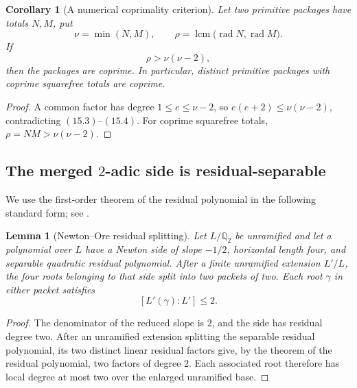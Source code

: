 \documentclass[11pt]{article}
\newtheorem{lemma}[theorem]{Lemma}
\newtheorem{corollary}[theorem]{Corollary}
\theoremstyle{definition}
\newcommand{\Q}{\mathbb Q}
\begin{document}
\begin{corollary}[A numerical coprimality criterion]
\label{cor:radicalcriterion}
Let two primitive packages have totals \(N,M\), put
\[
 \nu=\min(N,M),\qquad
 \rho=\operatorname{lcm}\bigl(\operatorname{rad}N,
                                \operatorname{rad}M\bigr).
\]
If
\begin{equation}
 \rho>\nu(\nu-2),
 \tag{15.4}
\end{equation}
then the packages are coprime.  In particular, distinct primitive packages
with coprime squarefree totals are coprime.
\end{corollary}

\begin{proof}
A common factor has degree \(1\leq e\leq\nu-2\), so
\(e(e+2)\leq\nu(\nu-2)\), contradicting \((15.3)\)--\((15.4)\).
For coprime squarefree totals, \(\rho=NM>\nu(\nu-2)\).
\end{proof}

\subsection{The merged \texorpdfstring{\(2\)}{2}-adic side is residual-separable}

We use the first-order theorem of the residual polynomial in the following
standard form; see \cite[Theorem~1.21]{GuardiaMontesNart2008}.

\begin{lemma}[Newton--Ore residual splitting]
\label{lem:oreresidual}
Let \(L/\Q_2\) be unramified and let a polynomial over \(L\) have a
Newton side of slope \(-1/2\), horizontal length four, and separable
quadratic residual polynomial.  After a finite unramified extension
\(L'/L\), the four roots belonging to that side split into two packets of
two.  Each root \(\gamma\) in either packet satisfies
\[
 [L'(\gamma):L']\leq2.
\]
\end{lemma}

\begin{proof}
The denominator of the reduced slope is \(2\), and the side has residual
degree two.  After an unramified extension splitting the separable residual
polynomial, its two distinct linear residual factors give, by the theorem of
the residual polynomial, two factors of degree \(2\).  Each associated root
therefore has local degree at most two over the enlarged unramified base.
\end{proof}
\end{document}

